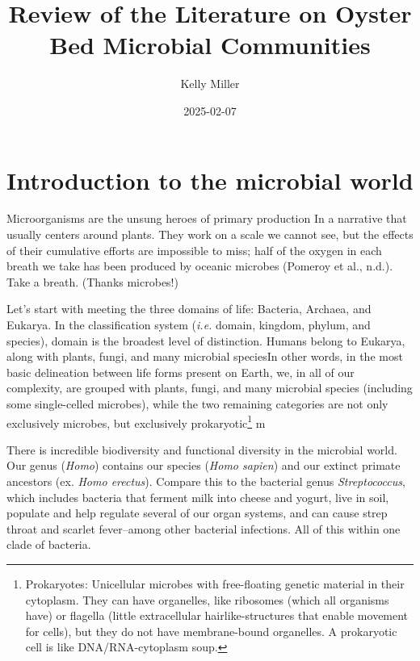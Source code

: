 \documentclass[
  11pt,
]{article}
\title{Review of the Literature on Oyster Bed Microbial Communities}
\author{Kelly Miller}
\date{2025-02-07}
\begin{document}
\maketitle

\section{Introduction to the microbial
world}\label{introduction-to-the-microbial-world}

Microorganisms are the unsung heroes of primary production In a
narrative that usually centers around plants. They work on a scale we
cannot see, but the effects of their cumulative efforts are impossible
to miss; half of the oxygen in each breath we take has been produced by
oceanic microbes (Pomeroy et al., n.d.). Take a breath. (Thanks
microbes!)

Let's start with meeting the three domains of life: Bacteria, Archaea,
and Eukarya. In the classification system (\emph{i.e.} domain, kingdom,
phylum, and species), domain is the broadest level of distinction.
Humans belong to Eukarya, along with plants, fungi, and many microbial
speciesIn other words, in the most basic delineation between life forms
present on Earth, we, in all of our complexity, are grouped with plants,
fungi, and many microbial species (including some single-celled
microbes), while the two remaining categories are not only exclusively
microbes, but exclusively prokaryotic\footnote{Prokaryotes: Unicellular
  microbes with free-floating genetic material in their cytoplasm. They
  can have organelles, like ribosomes (which all organisms have) or
  flagella (little extracellular hairlike-structures that enable
  movement for cells), but they do not have membrane-bound organelles. A
  prokaryotic cell is like DNA/RNA-cytoplasm soup.} m

There is incredible biodiversity and functional diversity in the
microbial world. Our genus (\emph{Homo}) contains our species
(\emph{Homo sapien}) and our extinct primate ancestors (ex. \emph{Homo
erectus}). Compare this to the bacterial genus \emph{Streptococcus},
which includes bacteria that ferment milk into cheese and yogurt, live
in soil, populate and help regulate several of our organ systems, and
can cause strep throat and scarlet fever--among other bacterial
infections. All of this within one clade of bacteria.
\end{document}
